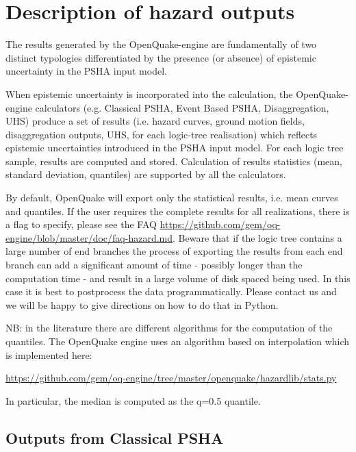 \section{Description of hazard outputs}
\label{sec:hazard_outputs}

The results generated by the OpenQuake-engine are fundamentally of two
distinct typologies differentiated by the presence (or absence) of epistemic
uncertainty in the PSHA input model.

When epistemic uncertainty is incorporated into the calculation, the
OpenQuake-engine calculators (e.g. Classical PSHA, Event Based PSHA,
Disaggregation, UHS) produce a set of results (i.e. hazard curves, ground
motion fields, disaggregation outputs, UHS, for each logic-tree realisation)
which reflects epistemic uncertainties introduced in the PSHA input model.
For each logic tree sample, results are computed and stored. Calculation of
results statistics (mean, standard deviation, quantiles) are supported by all
the calculators.

By default, OpenQuake will export only the statistical results, i.e. mean
curves and quantiles. If the user requires the complete results for all
realizations, there is a flag to specify, please see the FAQ \href{https://github.com/gem/oq-engine/blob/master/doc/faq-hazard.md}{https://github.com/gem/oq-engine/blob/master/doc/faq-hazard.md}.
Beware that if the logic tree contains a large number of end branches the
process of exporting the results from each end branch can add a significant
amount of time - possibly longer than the computation time - and result in a
large volume of disk spaced being used. In this case it is best to postprocess
the data programmatically. Please contact us and we will be happy to give
directions on how to do that in Python.

NB: in the literature there are different algorithms for the computation
of the quantiles. The OpenQuake engine uses an algorithm based on interpolation
which is implemented here:

\href{https://github.com/gem/oq-engine/tree/master/openquake/hazardlib/stats.py}{https://github.com/gem/oq-engine/tree/master/openquake/hazardlib/stats.py}

In particular, the median is computed as the q=0.5 quantile.

\subsection{Outputs from Classical PSHA}
\label{subsec:output_classical_psha}



